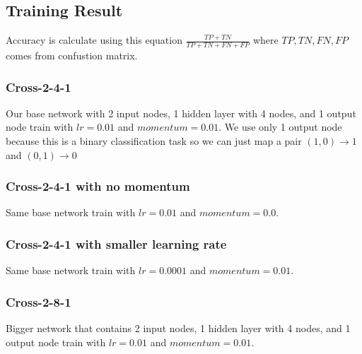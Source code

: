 \documentclass{article}
\begin{document}
\subsection*{Training Result}
Accuracy is calculate using this equation $\frac{TP+TN}{TP+TN+FN+FP}$ where $TP, TN, FN, FP$ comes from confustion matrix.
\subsubsection*{Cross-2-4-1}
Our base network with 2 input nodes, 1 hidden layer with 4 nodes, and 1 output node train with $lr = 0.01$ and $momentum = 0.01$. We use only 1 output node because this is a binary classification task so we can just map a pair $(1, 0) \rightarrow 1$ and $(0, 1) \rightarrow 0$
\subsubsection*{Cross-2-4-1 with no momentum}
Same base network train with $lr = 0.01$ and $momentum = 0.0$.
\subsubsection*{Cross-2-4-1 with smaller learning rate}
Same base network train with $lr = 0.0001$ and $momentum = 0.01$.
\subsubsection*{Cross-2-8-1}
Bigger network that contains 2 input nodes, 1 hidden layer with 4 nodes, and 1 output node train with $lr = 0.01$ and $momentum = 0.01$.
\end{document}
